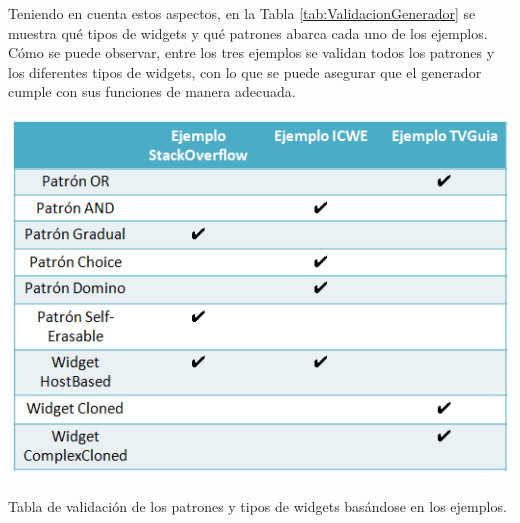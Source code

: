 Teniendo en cuenta estos aspectos, en la Tabla \ref{tab:ValidacionGenerador} se muestra qué tipos de widgets y qué patrones abarca cada uno de los ejemplos. Cómo se puede observar, entre los tres ejemplos se validan todos los patrones y los diferentes tipos de widgets, con lo que se puede asegurar que el generador cumple con sus funciones de manera adecuada.

\begin{table}
\centering
\includegraphics[width=0.7\linewidth]{./figs/5-Validacion.png}
\caption{Tabla de validación de los patrones y tipos de widgets basándose en los ejemplos.}
\label{tab:ValidacionGenerador}
\end{table} 
